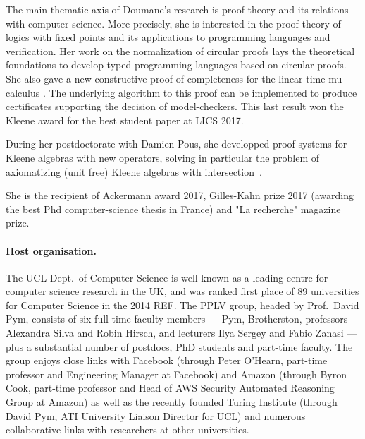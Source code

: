 \documentclass[11pt,twocolumn]{article}
\begin{document}
The main thematic axis of Doumane's research is proof theory and its relations with computer science. More precisely, she is interested in the proof theory of logics with fixed points and its applications to programming languages and verification. Her work on the normalization of circular proofs  lays the theoretical foundations to develop typed programming languages based on circular proofs. She also gave a new constructive proof of completeness for the linear-time mu-calculus . The underlying  algorithm to this proof can be implemented to produce certificates supporting the decision of model-checkers. This last result won the Kleene award for the best student paper at LICS 2017.

During her postdoctorate with Damien Pous, she developped proof systems for Kleene algebras with new operators, solving in particular the problem of axiomatizing (unit free) Kleene algebras with intersection~.

She is the recipient of Ackermann award 2017, Gilles-Kahn prize 2017 (awarding the best Phd computer-science thesis  in France) and "La recherche" magazine prize.

\paragraph{Host organisation.}
The UCL Dept.\ of Computer Science is well known as a leading centre for computer science research in the UK, and was ranked first place of 89 universities for Computer Science in the 2014 REF. The PPLV group, headed by Prof.\ David Pym, consists of six full-time faculty members --- Pym, Brotherston, professors Alexandra Silva and Robin Hirsch, and lecturers Ilya Sergey and Fabio Zanasi --- plus a substantial number of postdocs, PhD students and part-time faculty. The group enjoys close links with Facebook (through Peter O'Hearn, part-time professor and Engineering Manager at Facebook) and Amazon (through Byron Cook, part-time professor and Head of AWS Security Automated Reasoning Group at Amazon) as well as the recently founded Turing Institute (through David Pym, ATI University Liaison Director for UCL) and numerous collaborative links with researchers at other universities.



\newpage
{\footnotesize
\begin{spacing}{0.9}
\end{spacing}
}
\end{document}
